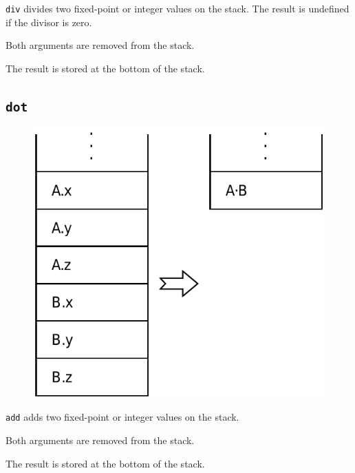 			\texttt{div} divides two fixed-point or integer values on the
			stack.  The result is undefined if the divisor is zero.
			
			Both arguments are removed from the stack.
			
			The result is stored at the bottom of the stack.
	
	\qquad
	
	\subsection*{\texttt{dot}}
	
		\begin{figure}
			\begin{flushright}
				\includegraphics[width=\linewidth]{figure/pdf/i_dot} 
			\end{flushright}
		\end{figure}
	
			\texttt{add} adds two fixed-point or integer values on the stack.
			
			Both arguments are removed from the stack.
			
			The result is stored at the bottom of the stack. \\\\\\\\
	
	\qquad\qquad

